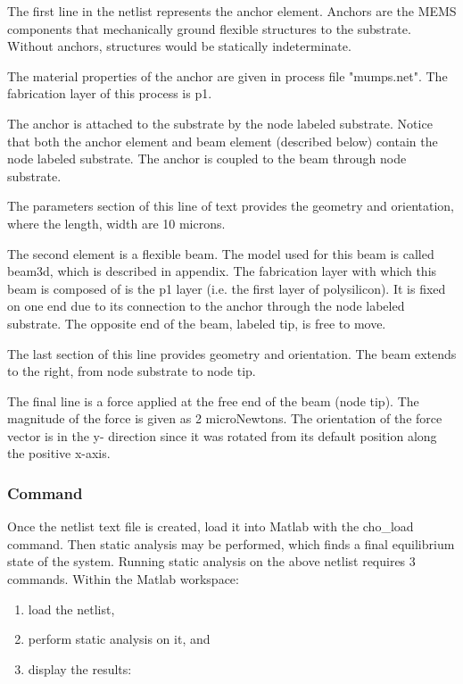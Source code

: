 The first line in the netlist represents the anchor element. Anchors are the
MEMS components that mechanically ground flexible structures to the substrate.
Without anchors, structures would be statically indeterminate.  

The material properties of the anchor are given in process file "mumps.net".
The fabrication layer of this process is p1.  

The anchor is attached to the substrate by the node labeled substrate. Notice
that both the anchor element and beam element (described below) contain the
node labeled substrate.  The anchor is coupled to the beam through node
substrate. 

The parameters section of this line of text provides the geometry and
orientation, where the length, width are 10 microns.  

The second element is a flexible beam. The model used for this beam is called
beam3d, which is described in appendix. The fabrication layer with which this
beam is composed of is the p1 layer (i.e. the first layer of polysilicon). It
is fixed on one end due to its connection to the anchor through the node
labeled substrate. The opposite end of the beam, labeled tip, is free to move.  

The last section of this line provides geometry and orientation. The beam
extends to the right, from node substrate to node tip. 

The final line is a force applied at the free end of the beam (node tip). The
magnitude of the force is given as 2 microNewtons. The orientation of the force
vector is in the y- direction since it was rotated from its default position
along the positive x-axis.  


\subsubsection*{Command}

Once the netlist text file is created, load it into Matlab with the
cho\_load command.
Then static analysis may be
performed, which finds a final equilibrium state of the system. Running static
analysis on the above netlist requires 3 commands.   Within the Matlab
workspace:
\begin{enumerate}
 \item load the netlist, 
 \item perform static analysis on it, and 
 \item display the results: 
\end{enumerate}

